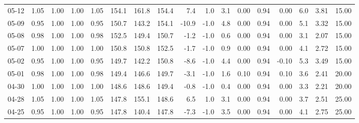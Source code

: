 \begin{threeparttable}
{\begin{tabular}{lrrrrrrrrrrrrrrrr}
  05-12 &         1.05 &           1.00 &          1.00 &          1.05 & 154.1 & 161.8 & 154.4 &        7.4 &                      1.0 &                 3.1 &       0.00 &      0.94 &           0.00 &              6.0 &            3.81 &                  15.00 \\
  05-09 &         0.95 &           1.00 &          1.00 &          0.95 & 150.7 & 143.2 & 154.1 &      -10.9 &                     -1.0 &                 4.8 &       0.00 &      0.94 &           0.00 &              5.1 &            3.32 &                  15.00 \\
  05-08 &         0.98 &           1.00 &          1.00 &          0.98 & 152.5 & 149.4 & 150.7 &       -1.2 &                     -1.0 &                 0.6 &       0.00 &      0.94 &           0.00 &              3.1 &            2.07 &                  15.00 \\
  05-07 &         1.00 &           1.00 &          1.00 &          1.00 & 150.8 & 150.8 & 152.5 &       -1.7 &                     -1.0 &                 0.9 &       0.00 &      0.94 &           0.00 &              4.1 &            2.72 &                  15.00 \\
  05-02 &         0.95 &           1.00 &          1.00 &          0.95 & 149.7 & 142.2 & 150.8 &       -8.6 &                     -1.0 &                 4.4 &       0.00 &      0.94 &          -0.10 &              5.3 &            3.49 &                  15.00 \\
  05-01 &         0.98 &           1.00 &          1.00 &          0.98 & 149.4 & 146.6 & 149.7 &       -3.1 &                     -1.0 &                 1.6 &       0.10 &      0.94 &           0.10 &              3.6 &            2.41 &                  20.00 \\
  04-30 &         1.00 &           1.00 &          1.00 &          1.00 & 148.6 & 148.6 & 149.4 &       -0.8 &                     -1.0 &                 0.4 &       0.00 &      0.94 &           0.00 &              3.3 &            2.21 &                  20.00 \\
  04-28 &         1.05 &           1.00 &          1.00 &          1.05 & 147.8 & 155.1 & 148.6 &        6.5 &                      1.0 &                 3.1 &       0.00 &      0.94 &           0.00 &              3.7 &            2.51 &                  25.00 \\
  04-25 &         0.95 &           1.00 &          1.00 &          0.95 & 147.8 & 140.4 & 147.8 &       -7.3 &                     -1.0 &                 3.5 &       0.00 &      0.94 &           0.00 &              4.1 &            2.75 &                  25.00 \\

\end{tabular}}
\end{threeparttable}
